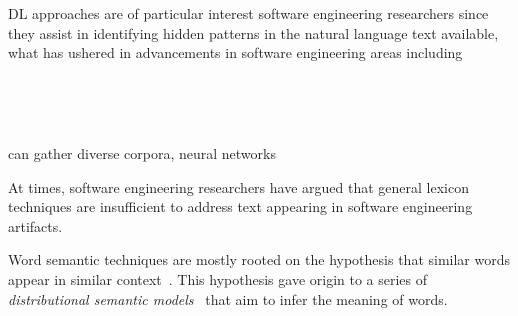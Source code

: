 











\acs{DL} approaches are of particular interest 
software engineering researchers 
since they assist in identifying hidden patterns 
in the natural language text available,
what has ushered in advancements in software engineering areas 
including


~\cite{sharafi2015}




~\cite{sharafi2015} 



can gather diverse corpora, neural networks 








At times, software engineering researchers have argued
that general lexicon techniques 
are insufficient to address text appearing in
software engineering artifacts. 




Word semantic techniques are mostly rooted on the hypothesis
that similar words appear in similar context~\cite{harris1954distributional}.
This hypothesis gave origin to a series of
\textit{distributional semantic models}~\cite{Ye2016} that aim to infer the meaning of words.



